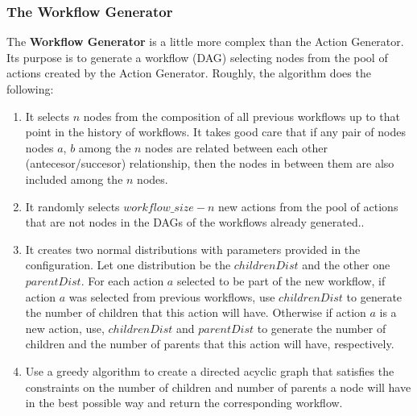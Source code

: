 \subsubsection{The Workflow Generator}
The \textbf{Workflow Generator} is a little more complex than the Action Generator.  Its purpose is to generate a workflow (DAG) selecting nodes from the pool of actions created by the Action Generator. Roughly, the algorithm does the following:
\begin{enumerate}
\item It selects $n$ nodes from the composition of all previous workflows up to that point in the history of workflows. It takes good care that if any pair of nodes nodes $a$, $b$ among the $n$ nodes are related between each other (antecesor/succesor) relationship, then the nodes in between them are also included among the $n$ nodes.

\item It randomly selects $workflow\_size - n$ new actions from the pool of actions that are not nodes in the DAGs of the workflows already generated..

\item It creates two normal distributions with parameters provided in the configuration.  Let one distribution be the $childrenDist$ and the other one $parentDist$. For each action $a$ selected to be part of the new workflow, if action $a$ was selected from previous workflows, use $childrenDist$ to generate the number of children that this action will have.  Otherwise if action $a$ is a new action, use, $childrenDist$ and $parentDist$ to generate the number of children and the number of parents that this action will have, respectively.

\item Use a greedy algorithm to create a directed acyclic graph that satisfies the constraints on the number of children and number of parents a node will have in the best possible way and return the corresponding workflow.
\end{enumerate}

